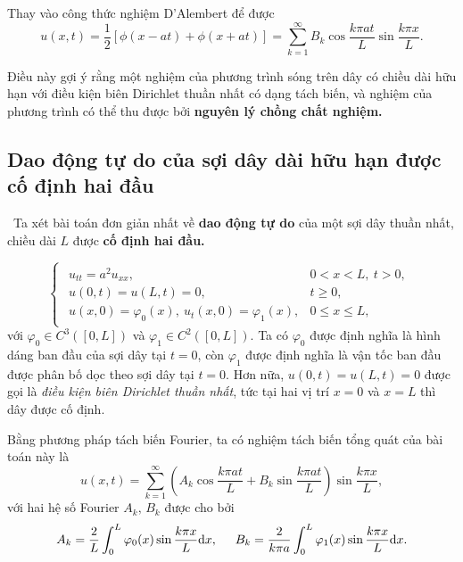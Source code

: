 \documentclass[10pt, a4paper]{article}
\begin{document}
	Thay vào công thức nghiệm D'Alembert để được $$u(x,t)=\frac12[\phi(x-at)+\phi(x+at)]=\sum_{k=1}^\infty B_k\cos\frac{k\pi at}{L}\sin\dfrac{k\pi x}{L}.$$
	
	Điều này gợi ý rằng một nghiệm của phương trình sóng trên dây có chiều dài hữu hạn với điều kiện biên Dirichlet thuần nhất có dạng tách biến, và nghiệm của phương trình có thể thu được bởi \textbf{nguyên lý chồng chất nghiệm.}
	\subsection{Dao động tự do của sợi dây dài hữu hạn được cố định hai đầu}
	\vspace{1mm}
	\quad\,\,\,Ta xét bài toán đơn giản nhất về \textbf{\color{red}dao động tự do} của một sợi dây thuần nhất, chiều dài $L$ được \textbf{\color{red}cố định hai đầu.}
	\vspace{1mm}
	\begin{tcolorbox}[enhanced,colback=blue!5!white,colframe=blue!75!black,sharp corners=all,shadow={0mm}{0mm}{-1.5mm}%
		{fill=blue!75!red,opacity=0.3},title=\textbf{Dạng của bài toán}]
		$$\begin{cases}
			\begin{array}{ll}
				u_{tt}=a^2u_{xx}, & 0<x<L,~t>0,\\
				u(0,t)=u(L,t)=0, & t\ge0,\\
				u(x,0)=\varphi_0(x),~u_t(x,0)=\varphi_1(x), & 0\le x\le L,
			\end{array}
		\end{cases}$$
		với $\varphi_0\in C^3([0,L])$ và $\varphi_1\in C^2([0,L])$.\vskip7pt
		\quad Ta có $\varphi_0$ được định nghĩa là hình dáng ban đầu của sợi dây tại $t=0$, còn $\varphi_1$ được định nghĩa là vận tốc ban đầu được phân bố dọc theo sợi dây tại $t=0$.\vskip7pt
		\quad Hơn nữa, $u(0,t)=u(L,t)=0$ được gọi là \textit{điều kiện biên Dirichlet thuần nhất}, tức tại hai vị trí $x=0$ và $x=L$ thì dây được cố định.
	\end{tcolorbox}
	\vspace{2mm}
	Bằng phương pháp tách biến Fourier, ta có nghiệm tách biến tổng quát của bài toán này là $$u(x,t)=\displaystyle\sum_{k=1}^\infty\left(A_k\cos\dfrac{k\pi at}{L}+B_k\sin\dfrac{k\pi at}{L}\right)\sin\dfrac{k\pi x}{L},$$
	với hai hệ số Fourier $A_k,\,B_k$ được cho bởi $$A_k=\dfrac2L\displaystyle\int_0^L\varphi_0(x)\sin\dfrac{k\pi x}{L}\text{d}x,\hspace{0.5cm}
	B_k=\dfrac{2}{k\pi a}\displaystyle\int_0^L\varphi_1(x)\sin\dfrac{k\pi x}{L}\text{d}x.$$
	
\end{document}
